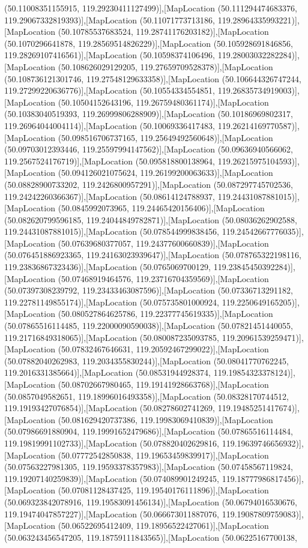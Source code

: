 (50.11008351155915, 119.29230411127499)],[MapLocation (50.111294474683376, 119.29067332819393)],[MapLocation (50.11071773713186, 119.28964335993221)],[MapLocation (50.10785537683524, 119.28741176203182)],[MapLocation (50.1070296641878, 119.28569514826229)],[MapLocation (50.105928691846856, 119.28269107416561)],[MapLocation (50.10598374106496, 119.28003032282284)],[MapLocation (50.108626029129205, 119.27659709528378)],[MapLocation (50.108736121301746, 119.27548129633358)],[MapLocation (50.106644326747244, 119.27299220636776)],[MapLocation (50.10554334554851, 119.26835734919003)],[MapLocation (50.10504152643196, 119.26759480361174)],[MapLocation (50.10383040519393, 119.26999806288909)],[MapLocation (50.10186969802317, 119.26964044004114)],[MapLocation (50.10069336417483, 119.26214169770587)],[MapLocation (50.098516706737165, 119.25649492560648)],[MapLocation (50.09703012393446, 119.25597994147562)],[MapLocation (50.09636940566062, 119.2567524176719)],[MapLocation (50.095818800138964, 119.26215975104593)],[MapLocation (50.094126021075624, 119.26199200063633)],[MapLocation (50.08828900733202, 119.2426800957291)],[MapLocation (50.087297745702536, 119.24242260366367)],[MapLocation (50.08614124788937, 119.24431087881015)],[MapLocation (50.0845992073965, 119.24465420156406)],[MapLocation (50.082620799596185, 119.24044849782871)],[MapLocation (50.08036262902588, 119.24431087881015)],[MapLocation (50.078544999838456, 119.24542667776035)],[MapLocation (50.07639680377057, 119.24377600660839)],[MapLocation (50.076451886923365, 119.24163023939647)],[MapLocation (50.078765322198116, 119.23836867323436)],[MapLocation (50.0765069700129, 119.23845450392284)],[MapLocation (50.07468919464576, 119.23716704359569)],[MapLocation (50.07397308239792, 119.23433463087596)],[MapLocation (50.07336713291182, 119.22781149855174)],[MapLocation (50.075735801000924, 119.2250649165205)],[MapLocation (50.080527864625786, 119.22377745619335)],[MapLocation (50.07865516114485, 119.22000090590038)],[MapLocation (50.07821451440055, 119.21716849318065)],[MapLocation (50.080087235093785, 119.20961539259471)],[MapLocation (50.07832467646631, 119.20592467299022)],[MapLocation (50.07882040262983, 119.2034355830244)],[MapLocation (50.08041770762245, 119.2016331385664)],[MapLocation (50.08531944928374, 119.19854323378124)],[MapLocation (50.08702667980465, 119.19141928663768)],[MapLocation (50.0857049582651, 119.18996016493358)],[MapLocation (50.08328170744512, 119.19193427076854)],[MapLocation (50.08278602741269, 119.19485251417674)],[MapLocation (50.081629420737386, 119.19983069410839)],[MapLocation (50.07986691880904, 119.19991652479686)],[MapLocation (50.07865516114484, 119.19819991102733)],[MapLocation (50.078820402629816, 119.19639746656932)],[MapLocation (50.07772542850838, 119.19653459839917)],[MapLocation (50.07563227981305, 119.19593378357983)],[MapLocation (50.07458567119824, 119.19207140259839)],[MapLocation (50.074089901249245, 119.18777986817456)],[MapLocation (50.07081128437425, 119.19540176111896)],[MapLocation (50.069323842078916, 119.19583091456134)],[MapLocation (50.06794016530676, 119.19474047857227)],[MapLocation (50.066673011887076, 119.19087809759083)],[MapLocation (50.06522695412409, 119.18956522427061)],[MapLocation (50.063243456547205, 119.18759111843565)],[MapLocation (50.06225167700138, 